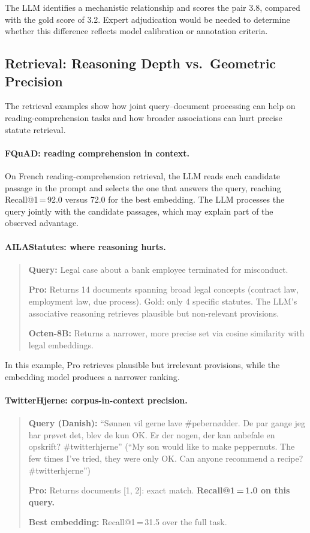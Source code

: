 \noindent The LLM identifies a mechanistic relationship and scores the pair 3.8, compared with the gold score of 3.2.
Expert adjudication would be needed to determine whether this difference reflects model calibration or annotation criteria.


\subsection{Retrieval: Reasoning Depth vs.\ Geometric Precision}

The retrieval examples show how joint query--document processing can help on reading-comprehension tasks and how broader associations can hurt precise statute retrieval.

\paragraph{FQuAD: reading comprehension in context.}
On French reading-comprehension retrieval, the LLM reads each candidate passage in the prompt and selects the one that answers the query, reaching Recall@1\,=\,92.0 versus 72.0 for the best embedding.
The LLM processes the query jointly with the candidate passages, which may explain part of the observed advantage.

\paragraph{AILAStatutes: where reasoning hurts.}
\begin{quote}
\small
\textbf{Query:} Legal case about a bank employee terminated for misconduct.

\textbf{Pro:} Returns 14 documents spanning broad legal concepts (contract law, employment law, due process). Gold: only 4 specific statutes.
The LLM's associative reasoning retrieves plausible but non-relevant provisions.

\textbf{Octen-8B:} Returns a narrower, more precise set via cosine similarity with legal embeddings.
\end{quote}

\noindent In this example, Pro retrieves plausible but irrelevant provisions, while the embedding model produces a narrower ranking.

\paragraph{TwitterHjerne: corpus-in-context precision.}
\begin{quote}
\small
\textbf{Query (Danish):} ``S{\o}nnen vil gerne lave \#pebern{\o}dder. De par gange jeg har pr{\o}vet det, blev de kun OK. Er der nogen, der kan anbefale en opskrift? \#twitterhjerne''
(``My son would like to make peppernuts. The few times I've tried, they were only OK. Can anyone recommend a recipe? \#twitterhjerne'')

\textbf{Pro:} Returns documents [1, 2]: exact match. \textbf{Recall@1\,=\,1.0 on this query.}

\textbf{Best embedding:} Recall@1\,=\,31.5 over the full task.
\end{quote}

